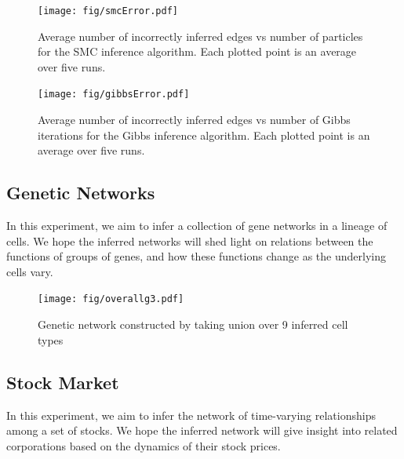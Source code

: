 \documentclass{article}
\begin{document}
\begin{figure}[h!tbp]
  \centering               
  \texttt{[image: fig/smcError.pdf]}
  \caption{Average number of incorrectly inferred edges vs number of particles for the SMC inference algorithm. Each plotted point is an average over five runs.}
  \label{fig:errorVsParticles}
\end{figure}

\begin{figure}[h!tbp]
  \centering               
  \texttt{[image: fig/gibbsError.pdf]}
  \caption{Average number of incorrectly inferred edges vs number of Gibbs iterations for the Gibbs inference algorithm. Each plotted point is an average over five runs.}
  \label{fig:errorVsSamples}
\end{figure}


\subsection{Genetic Networks}
In this experiment, we aim to infer a collection of gene networks in a lineage of cells. We hope the inferred networks will shed light on relations between the functions of groups of genes, and how these functions change as the underlying cells vary.

\begin{figure}[h!tbp]
  \centering               
  \texttt{[image: fig/overallg3.pdf]}
  \caption{Genetic network constructed by taking union over 9 inferred cell types}
  \label{fig:geneResults}
\end{figure}


\subsection{Stock Market}
In this experiment, we aim to infer the network of time-varying relationships among a set of stocks. We hope the inferred network will give insight into related corporations based on the dynamics of their stock prices.
\end{document}
